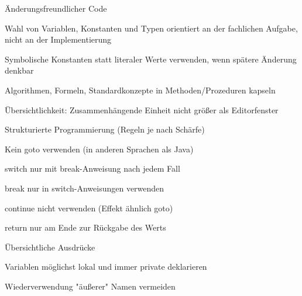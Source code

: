 \documentclass[a4paper]{article}
\begin{document}
\begin{multicols}{3}
  Änderungsfreundlicher Code
  \begin{itemize*}
    \item Wahl von Variablen, Konstanten und Typen orientiert an der fachlichen Aufgabe, nicht an der Implementierung
    \item Symbolische Konstanten statt literaler Werte verwenden, wenn spätere Änderung denkbar
    \item Algorithmen, Formeln, Standardkonzepte in Methoden/Prozeduren kapseln
    \item Übersichtlichkeit: Zusammenhängende Einheit nicht größer als Editorfenster
    \item Strukturierte Programmierung (Regeln je nach Schärfe)
    \begin{itemize*}
      \item Kein goto verwenden (in anderen Sprachen als Java)
      \item switch nur mit break-Anweisung nach jedem Fall
      \item break nur in switch-Anweisungen verwenden
      \item continue nicht verwenden (Effekt ähnlich goto)
      \item return nur am Ende zur Rückgabe des Werts
    \end{itemize*}
    \item Übersichtliche Ausdrücke
    \item Variablen möglichst lokal und immer private deklarieren
    \item Wiederverwendung "äußerer" Namen vermeiden
  \end{itemize*}


\end{multicols}
\end{document}
